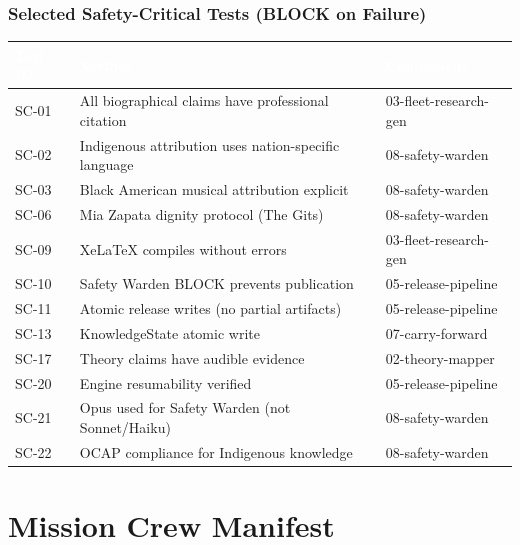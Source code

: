 \documentclass[11pt,letterpaper]{article}
\newcommand{\tblhdr}[1]{\textbf{\sffamily\textcolor{white}{#1}}}
\begin{document}
\subsubsection{Selected Safety-Critical Tests (BLOCK on Failure)}

\begin{center}
\begin{tabularx}{\textwidth}{L{1.5cm}XL{3.5cm}}
\toprule
{}
\tblhdr{Test ID} & \tblhdr{Verifies} & \tblhdr{Component} \\
\midrule
SC-01 & All biographical claims have professional citation & 03-fleet-research-gen \\
SC-02 & Indigenous attribution uses nation-specific language & 08-safety-warden \\
SC-03 & Black American musical attribution explicit & 08-safety-warden \\
SC-06 & Mia Zapata dignity protocol (The Gits) & 08-safety-warden \\
SC-09 & XeLaTeX compiles without errors & 03-fleet-research-gen \\
SC-10 & Safety Warden BLOCK prevents publication & 05-release-pipeline \\
SC-11 & Atomic release writes (no partial artifacts) & 05-release-pipeline \\
SC-13 & KnowledgeState atomic write & 07-carry-forward \\
SC-17 & Theory claims have audible evidence & 02-theory-mapper \\
SC-20 & Engine resumability verified & 05-release-pipeline \\
SC-21 & Opus used for Safety Warden (not Sonnet/Haiku) & 08-safety-warden \\
SC-22 & OCAP\textregistered{} compliance for Indigenous knowledge & 08-safety-warden \\
\bottomrule
\end{tabularx}
\end{center}

\section{Mission Crew Manifest}
\end{document}
